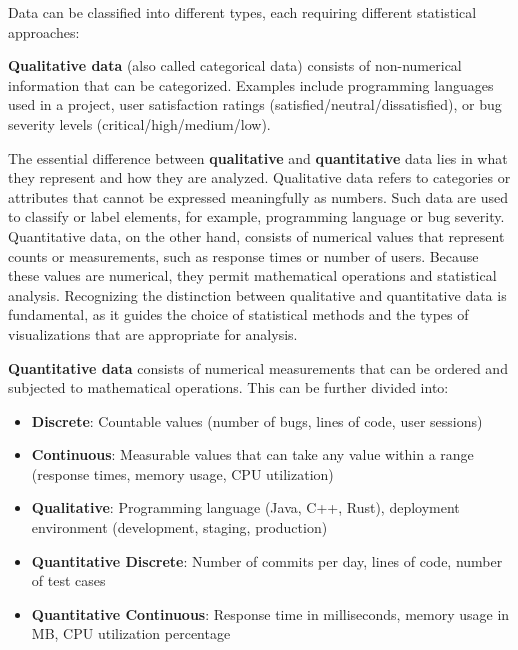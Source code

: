 Data can be classified into different types, each requiring different statistical approaches:

\begin{definition}
\textbf{Qualitative data} (also called categorical data) consists of non-numerical information that can be categorized. Examples include programming languages used in a project, user satisfaction ratings (satisfied/neutral/dissatisfied), or bug severity levels (critical/high/medium/low).
\end{definition}

The essential difference between \textbf{qualitative} and \textbf{quantitative} data lies in what they represent and how they are analyzed. Qualitative data refers to categories or attributes that cannot be expressed meaningfully as numbers. Such data are used to classify or label elements, for example, programming language or bug severity. Quantitative data, on the other hand, consists of numerical values that represent counts or measurements, such as response times or number of users. Because these values are numerical, they permit mathematical operations and statistical analysis. Recognizing the distinction between qualitative and quantitative data is fundamental, as it guides the choice of statistical methods and the types of visualizations that are appropriate for analysis.

\begin{definition}
\textbf{Quantitative data} consists of numerical measurements that can be ordered and subjected to mathematical operations. This can be further divided into:
\begin{itemize}
    \item \textbf{Discrete}: Countable values (number of bugs, lines of code, user sessions)
    \item \textbf{Continuous}: Measurable values that can take any value within a range (response times, memory usage, CPU utilization)
\end{itemize}
\end{definition}

\begin{example}
\begin{itemize}
    \item \textbf{Qualitative}: Programming language (Java, C++, Rust), deployment environment (development, staging, production)
    \item \textbf{Quantitative Discrete}: Number of commits per day, lines of code, number of test cases
    \item \textbf{Quantitative Continuous}: Response time in milliseconds, memory usage in MB, CPU utilization percentage
\end{itemize}
\end{example}

